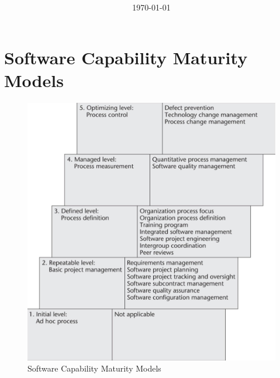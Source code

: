 \documentclass[11pt]{article}
\title{\textbf{\Topic}}
\author{\Name}
\date{\today}
\begin{document}
\maketitle
\noindent\makebox[\linewidth]{\rule[8pt]{5in}{0.5pt}}

\section*{Software Capability Maturity Models}

\begin{figure}[h]
	\centering
	\includegraphics[width=0.9\linewidth]{images/SW-CMM.png}
	\caption{Software Capability Maturity Models}
	\label{fig:SW-CMM}
\end{figure}
\end{document}
